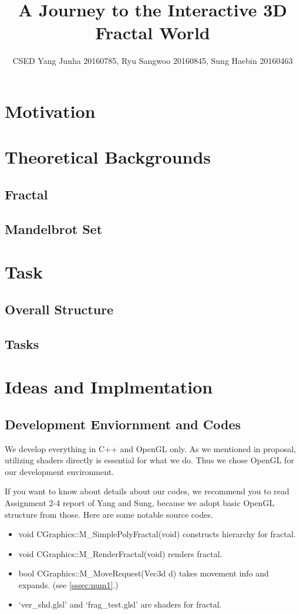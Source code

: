 \documentclass[a4paper]{article}
\title{A Journey to the Interactive 3D Fractal World}
\author{CSED Yang Junha 20160785, Ryu Sangwoo 20160845, Sung Haebin 20160463}
\begin{document}
\maketitle
\begin{abstract}

\end{abstract}
\section{Motivation}

\section{Theoretical Backgrounds}
\subsection{Fractal}
\subsection{Mandelbrot Set}

\section{Task}
\subsection{Overall Structure}
\subsection{Tasks}


\section{Ideas and Implmentation}
\subsection{Development Enviornment and Codes}
We develop everything in C++ and OpenGL only.
As we mentioned in proposal, utilizing shaders directly is essential for what we do.
Thus we chose OpenGL for our development environment.

If you want to know about details about our codes,
we recommend you to read Assignment 2-4 report of Yang and Sung, because we adopt basic OpenGL structure from those.
Here are some notable source codes.
\begin{itemize}
  \item void CGraphics::M\_SimplePolyFractal(void) constructs hierarchy for fractal.
  \item void CGraphics::M\_RenderFractal(void) renders fractal.
  \item bool CGraphics::M\_MoveRequest(Vec3d d) takes movement info and expands. (see \ref{sssec:num1}.)
  \item `ver\_shd.glsl' and `frag\_test.glsl' are shaders for fractal.
\end{itemize}
\end{document}
